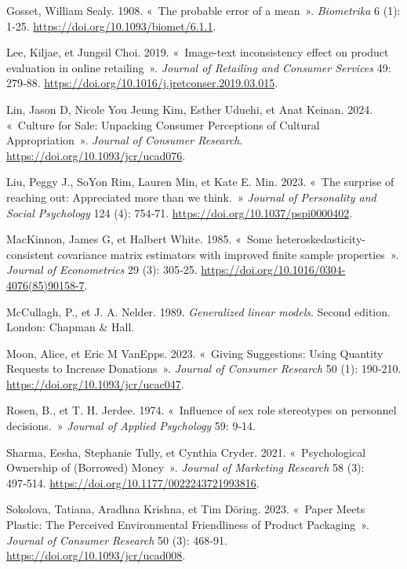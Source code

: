 \documentclass[
  11pt,
  letterpaper,
]{scrbook}
\newlength{\cslhangindent}
\newenvironment{CSLReferences}[2] %
 {\begin{list}{}{%
  \setlength{\itemindent}{0pt}
  \setlength{\leftmargin}{0pt}
  \setlength{\parsep}{0pt}
  \ifodd #1
   \setlength{\leftmargin}{\cslhangindent}
   \setlength{\itemindent}{-1\cslhangindent}
  \fi
  \setlength{\itemsep}{#2\baselineskip}}}
 {\end{list}}
\theoremstyle{definition}
\theoremstyle{definition}
\theoremstyle{plain}
\theoremstyle{plain}
\theoremstyle{remark}
\begin{document}
\begin{CSLReferences}{1}{0}
Gosset, William Sealy. 1908. {«~The probable error of a mean~»}.
\emph{Biometrika} 6 (1): 1‑25.
\url{https://doi.org/10.1093/biomet/6.1.1}.

Lee, Kiljae, et Jungsil Choi. 2019. {«~Image-text inconsistency effect
on product evaluation in online retailing~»}. \emph{Journal of Retailing
and Consumer Services} 49: 279‑88.
\url{https://doi.org/10.1016/j.jretconser.2019.03.015}.

Lin, Jason D, Nicole You Jeung Kim, Esther Uduehi, et Anat Keinan. 2024.
{«~Culture for Sale: Unpacking Consumer Perceptions of Cultural
Appropriation~»}. \emph{Journal of Consumer Research}.
\url{https://doi.org/10.1093/jcr/ucad076}.

Liu, Peggy J., SoYon Rim, Lauren Min, et Kate E. Min. 2023. {«~The
surprise of reaching out: Appreciated more than we think.~»}
\emph{Journal of Personality and Social Psychology} 124 (4): 754‑71.
\url{https://doi.org/10.1037/pspi0000402}.

MacKinnon, James G, et Halbert White. 1985. {«~Some
heteroskedasticity-consistent covariance matrix estimators with improved
finite sample properties~»}. \emph{Journal of Econometrics} 29 (3):
305‑25. \url{https://doi.org/10.1016/0304-4076(85)90158-7}.

McCullagh, P., et J. A. Nelder. 1989. \emph{Generalized linear models}.
{S}econd edition. London: Chapman \& Hall.

Moon, Alice, et Eric M VanEpps. 2023. {«~Giving Suggestions: Using
Quantity Requests to Increase Donations~»}. \emph{Journal of Consumer
Research} 50 (1): 190‑210. \url{https://doi.org/10.1093/jcr/ucac047}.

Rosen, B., et T. H. Jerdee. 1974. {«~Influence of sex role stereotypes
on personnel decisions.~»} \emph{Journal of Applied Psychology} 59:
9‑14.

Sharma, Eesha, Stephanie Tully, et Cynthia Cryder. 2021.
{«~Psychological Ownership of (Borrowed) Money~»}. \emph{Journal of
Marketing Research} 58 (3): 497‑514.
\url{https://doi.org/10.1177/0022243721993816}.

Sokolova, Tatiana, Aradhna Krishna, et Tim Döring. 2023. {«~Paper Meets
Plastic: The Perceived Environmental Friendliness of Product
Packaging~»}. \emph{Journal of Consumer Research} 50 (3): 468‑91.
\url{https://doi.org/10.1093/jcr/ucad008}.


\end{CSLReferences}
\end{document}
